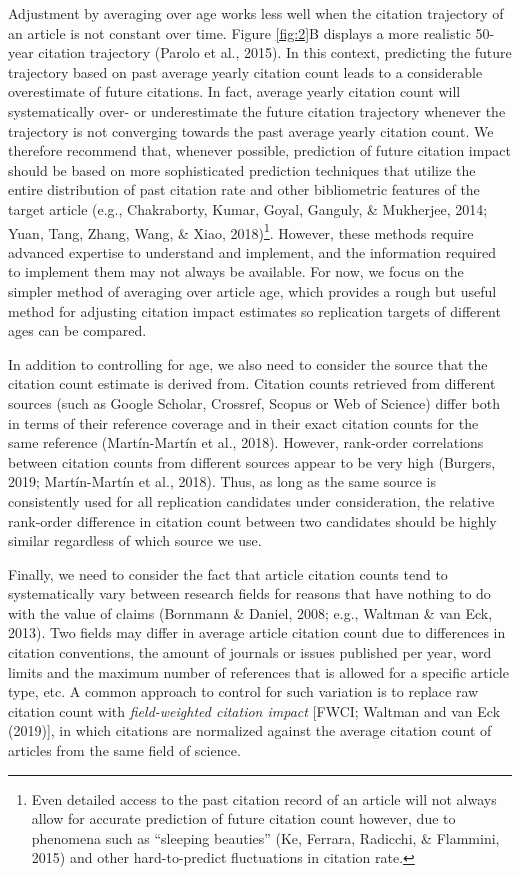 \documentclass[
  english,
  jou,floatsintext]{apa6}
\begin{document}
Adjustment by averaging over age works less well when the citation trajectory of an article is not constant over time. Figure \ref{fig:2}B displays a more realistic 50-year citation trajectory (Parolo et al., 2015). In this context, predicting the future trajectory based on past average yearly citation count leads to a considerable overestimate of future citations. In fact, average yearly citation count will systematically over- or underestimate the future citation trajectory whenever the trajectory is not converging towards the past average yearly citation count. We therefore recommend that, whenever possible, prediction of future citation impact should be based on more sophisticated prediction techniques that utilize the entire distribution of past citation rate and other bibliometric features of the target article (e.g., Chakraborty, Kumar, Goyal, Ganguly, \& Mukherjee, 2014; Yuan, Tang, Zhang, Wang, \& Xiao, 2018)\footnote{Even detailed access to the past citation record of an article will not always allow for accurate prediction of future citation count however, due to phenomena such as ``sleeping beauties'' (Ke, Ferrara, Radicchi, \& Flammini, 2015) and other hard-to-predict fluctuations in citation rate.}. However, these methods require advanced expertise to understand and implement, and the information required to implement them may not always be available. For now, we focus on the simpler method of averaging over article age, which provides a rough but useful method for adjusting citation impact estimates so replication targets of different ages can be compared.

In addition to controlling for age, we also need to consider the source that the citation count estimate is derived from. Citation counts retrieved from different sources (such as Google Scholar, Crossref, Scopus or Web of Science) differ both in terms of their reference coverage and in their exact citation counts for the same reference (Martín-Martín et al., 2018). However, rank-order correlations between citation counts from different sources appear to be very high (Burgers, 2019; Martín-Martín et al., 2018). Thus, as long as the same source is consistently used for all replication candidates under consideration, the relative rank-order difference in citation count between two candidates should be highly similar regardless of which source we use.

Finally, we need to consider the fact that article citation counts tend to systematically vary between research fields for reasons that have nothing to do with the value of claims (Bornmann \& Daniel, 2008; e.g., Waltman \& van Eck, 2013). Two fields may differ in average article citation count due to differences in citation conventions, the amount of journals or issues published per year, word limits and the maximum number of references that is allowed for a specific article type, etc. A common approach to control for such variation is to replace raw citation count with \emph{field-weighted citation impact} {[}FWCI; Waltman and van Eck (2019){]}, in which citations are normalized against the average citation count of articles from the same field of science.
\end{document}
